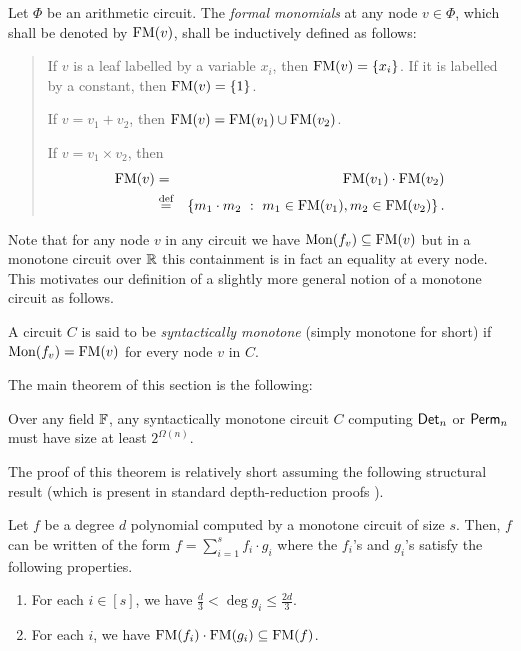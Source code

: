 	\begin{definition}
  Let $\Phi$ be an arithmetic circuit. The \emph{formal monomials} at
  any node $v\in \Phi$, which shall be denoted by $\mathrm{FM}(v)$, shall 
  be inductively defined as follows:
	  \begin{quote}
	    If $v$ is a leaf labelled by a variable $x_i$, then $\mathrm{FM}(v) =
	    \left\{x_i\right\}$. If it is labelled by a constant, then $\mathrm{FM}(v) =
	    \left\{1\right\}$.
	    
	    If $v = v_1 + v_2$, then $\mathrm{FM}(v) = \mathrm{FM}(v_1) \cup \mathrm{FM}(v_2)$. 
	
	    If $v = v_1 \times v_2$, then 
            \begin{eqnarray*}
              \mathrm{FM}(v) &=& \mathrm{FM}(v_1)\cdot \mathrm{FM}(v_2)\\
              &\stackrel{\text{def}}{=}& \left\{{m_1\cdot m_2}\ : \ {m_1 \in \mathrm{FM}(v_1), m_2\in \mathrm{FM}(v_2)}\right\}.
            \end{eqnarray*}
          \end{quote}
	\end{definition}
	
\noindent Note that for any node $v$ in any circuit 
	we have $\mathrm{Mon}(f_{v}) \subseteq \mathrm{FM}(v)$ but in a 
	monotone circuit over $\mathbb{R}$ this containment is in 
	fact an equality at every node. This motivates our 
	definition of a slightly more general notion of a 
	monotone circuit as follows. 

	
\begin{definition}
  A circuit $C$ is said to be
  \emph{syntactically monotone}
   (simply monotone for short) if $\mathrm{Mon}(f_{v}) = \mathrm{FM}(v)$ 
   for every node $v$ in $C$.
\end{definition}
	
	
	
The main theorem of this section is the following: 

\begin{theorem}[\cite{js82}]\label{thm:monotone-circuit-lbs}
	Over any field $\mathbb{F}$, any syntactically monotone circuit 
	$C$ computing $\mathsf{Det}_n$ or $\mathsf{Perm}_n$ must have
  size at least $2^{\Omega(n)}$.
\end{theorem}

The proof of this theorem is relatively short assuming the
	following structural result (which is present in standard
	depth-reduction proofs \cite{vsbr83,ajmv98}).

\begin{lemma}\label{lem:vsbr-two-thirds}
  Let $f$ be a degree $d$ polynomial computed by a monotone circuit of
  size $s$. Then, $f$ can be written of the form $f = \sum_{i=1}^s f_i
  \cdot g_i$ where the $f_i$'s and $g_i$'s satisfy the following
  properties.
\begin{enumerate}
\item For each $i\in [s]$, we have $\frac{d}{3} < \deg{g_i} \leq
  \frac{2d}{3}$.
\item For each $i$, we have $\mathrm{FM}(f_i)\cdot \mathrm{FM}(g_i) \subseteq \mathrm{FM}(f)$.
\end{enumerate}
\end{lemma}

